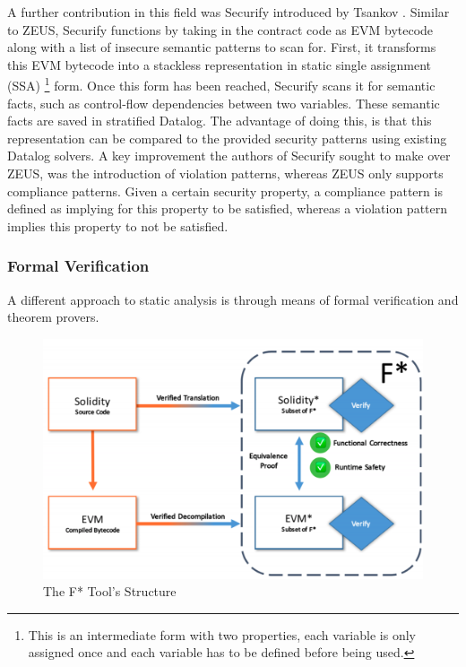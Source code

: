 \documentclass[letterpaper,twocolumn,10pt]{article}
\begin{document}
A further contribution in this field was Securify introduced by Tsankov \cite{tsankov_dan_drachsler-cohen_gervais_bünzli_vechev_2018}.  Similar to ZEUS, Securify functions by taking in the contract code as EVM bytecode along with a list of insecure semantic patterns to scan for. First, it transforms this EVM bytecode into a stackless representation in static single assignment (SSA) \footnote{This is an intermediate form with two properties, each variable is only assigned once and each variable has to be defined before being used.} form. Once this form has been reached, Securify scans it for semantic facts, such as control-flow dependencies between two variables. These semantic facts are saved in stratified Datalog. The advantage of doing this, is that this representation can be compared to the provided security patterns using existing Datalog solvers. A key improvement the authors of Securify sought to make over ZEUS, was the introduction of violation patterns, whereas ZEUS only supports compliance patterns. Given a certain security property, a compliance pattern is defined as implying for this property to be satisfied, whereas a violation pattern implies this property to not be satisfied.


\subsubsection{Formal Verification}
A different approach to static analysis is through means of formal verification and theorem provers. 

\begin{figure}
\begin{center}
\includegraphics[scale=0.2]{Fstar}
\end{center}
\caption{\label{fig:fstar} The F* Tool's Structure\cite{bhargavan_delignat-lavaud_fournet_gollamudi_gonthier_kobeissi_kulatova_rastogi_sibut-pinote_swamy_etal._2016}}
\end{figure}
\end{document}
